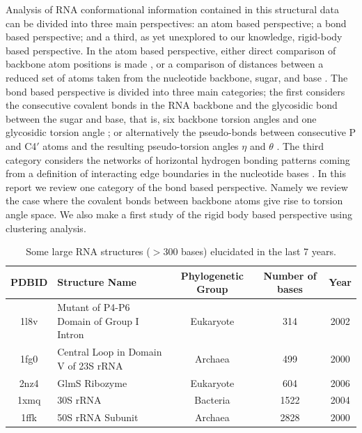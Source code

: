 \noindent Analysis of RNA conformational information contained in this
structural data can  be divided into three main  perspectives: an atom
based perspective; a bond  based perspective; and a third, as yet unexplored
to our knowledge,  rigid-body based perspective.   In the atom based
perspective,  either direct  comparison of  backbone atom  positions is
made \cite{reijmers2001}, or a comparison of distances between a reduced
set  of atoms  taken from  the  nucleotide backbone,  sugar, and  base
\cite{sykes2005}. The bond based  perspective is divided into three main
categories; the first considers the consecutive covalent bonds in the RNA
backbone and the glycosidic bond between the sugar and base,  that is, six
backbone   torsion   angles   and   one   glycosidic   torsion   angle
\cite{reijmers2001,  murray2003, hershkovitz2003, schneider2004,
hershkovitz2006};
or alternatively the pseudo-bonds between consecutive
P and  C4$\prime$ atoms  and the resulting  pseudo-torsion angles  $\eta$ and
$\theta$  \cite{olson1972,  duarte1998,  duarte2003, wadley2007}.  The
third category considers the  networks of horizontal hydrogen bonding
patterns coming  from a definition  of interacting edge  boundaries in
the nucleotide bases  \cite{westhof2000, leontis2002, leontis2006}. In
this report we review one category of the bond based
perspective. Namely we review the  case where the covalent bonds
between backbone atoms give rise to torsion angle space. We also make
a first study of the rigid body based perspective using clustering analysis.
\begin{table}[htbp]
\begin{center}
{\small
\begin{tabular}{c|p{5cm}|c|c|c}
\hline
\bf{PDBID} & \bf{Structure Name} & \bf{Phylogenetic Group} & \bf{Number of bases} & \bf{Year} \\ \hline
1l8v & Mutant of P4-P6 Domain of Group I Intron & Eukaryote & 314 & 2002 \\ \hline
1fg0 & Central Loop in Domain V of 23S rRNA & Archaea & 499 & 2000 \\ \hline
2nz4 & GlmS Ribozyme & Eukaryote & 604 & 2006 \\ \hline
1xmq & 30S rRNA & Bacteria & 1522 & 2004 \\ \hline
1ffk & 50S rRNA Subunit & Archaea & 2828 & 2000 \\ \hline
\end{tabular}
}
\caption{Some large RNA structures ($>$300 bases) elucidated in the last 7 years.}
\end{center}
\end{table}

